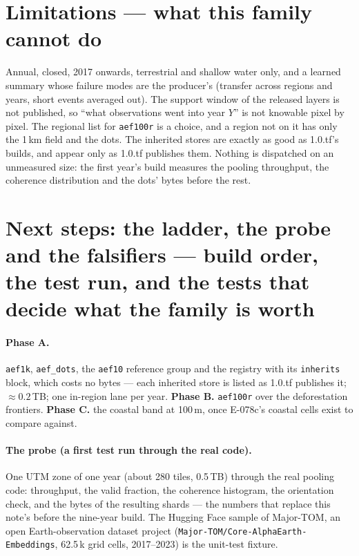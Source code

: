 \documentclass[10pt]{article}
\newcommand{\code}[1]{\texttt{#1}}
\begin{document}
\section{Limitations --- what this family cannot do}

Annual, closed, 2017 onwards, terrestrial and shallow water only, and a
learned summary whose failure modes are the producer's (transfer across
regions and years, short events averaged out). The support window of the
released layers is not published, so ``what observations went into year
$Y$'' is not knowable pixel by pixel. The regional list for \code{aef100r} is
a choice, and a region not on it has only the 1\,km field and the dots.
The inherited stores are exactly as good as 1.0.tf's builds, and appear only as 1.0.tf publishes them. Nothing is dispatched on an unmeasured size: the first year's build
measures the pooling throughput, the coherence distribution and the dots'
bytes before the rest.

\section{Next steps: the ladder, the probe and the falsifiers --- build order, the test run, and the tests that decide what the family is worth}

\paragraph{Phase A.} \code{aef1k}, \code{aef\_dots}, the \code{aef10}
reference group and the registry with its \code{inherits} block, which costs no bytes --- each inherited store is listed as 1.0.tf publishes it; $\approx 0.2$\,TB; one in-region lane per
year. \textbf{Phase B.} \code{aef100r} over the deforestation frontiers.
\textbf{Phase C.} the coastal band at 100\,m, once E-078c's coastal cells
exist to compare against.

\paragraph{The probe (a first test run through the real code).} One UTM zone of one year (about 280 tiles, 0.5\,TB)
through the real pooling code: throughput, the valid fraction, the
coherence histogram, the orientation check, and the bytes of the resulting
shards --- the numbers that replace this note's before the nine-year build.
The Hugging Face sample of Major-TOM, an open Earth-observation dataset project (\code{Major-TOM/Core-AlphaEarth-Embeddings}, 62.5\,k
grid cells, 2017--2023) is the unit-test fixture.
\end{document}
